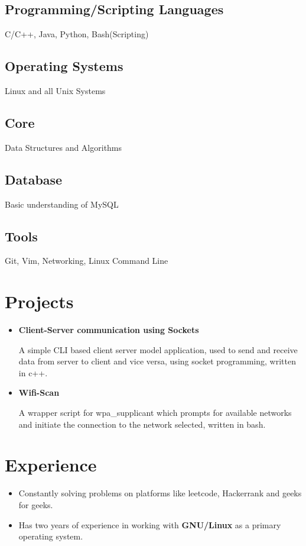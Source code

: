 \documentclass[11pt]{article}
\begin{document}
\subsection{Programming/Scripting Languages}
C/C++, Java, Python, Bash(Scripting)

\subsection{Operating Systems}
Linux and all Unix Systems

\subsection{Core}
Data Structures and Algorithms

\subsection{Database}
Basic understanding of MySQL

\subsection{Tools}
Git, Vim, Networking, Linux Command Line

\section{Projects}

\begin{itemize}[leftmargin=1mm]
\item[] {\bfseries Client-Server communication using Sockets}

A simple CLI based client server model application, used to send and receive data from
server to client and vice versa, using socket programming, written in c++.

\item[] {\bfseries Wifi-Scan}

A wrapper script for wpa\_supplicant which prompts for available networks and initiate the
connection to the network selected, written in bash.

\end{itemize}

\section{Experience}

\begin{itemize}[leftmargin=3mm]

\item Constantly solving problems on platforms like leetcode, Hackerrank and geeks for geeks.

\item Has two years of experience in working with {\bfseries GNU/Linux} as a primary operating system.

\end{itemize}
\end{document}
